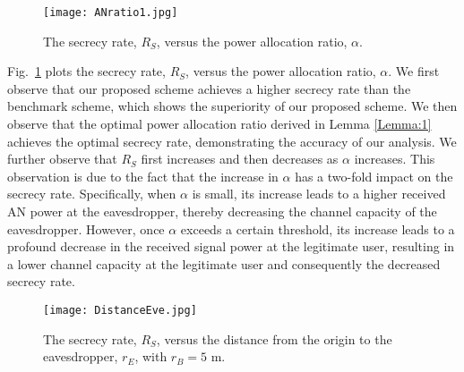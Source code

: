 \documentclass[10pt,technote]{IEEEtran}
\newcommand{\1}{\mathbbm{1}}
\begin{document}
\begin{figure}
    \centering
    \texttt{[image: ANratio1.jpg]}
    \vspace{-1em}
    \caption{The secrecy rate, $R_S$, versus the power allocation ratio, $\alpha$.}
    \vspace{-1.2em}
    \label{fig:num1}
\end{figure}

Fig.~\ref{fig:num1} plots the secrecy rate, $R_S$, versus the power allocation ratio, $\alpha$. We first observe that our proposed scheme achieves a higher secrecy rate than the benchmark scheme, which shows the superiority of our proposed scheme. We then observe that the optimal power allocation ratio derived in Lemma \ref{Lemma:1} achieves the optimal secrecy rate, demonstrating the accuracy of our analysis. We further observe that $R_S$ first increases and then decreases as $\alpha$ increases. This observation is due to the fact that the increase in $\alpha$ has a two-fold impact on the secrecy rate. Specifically, when $\alpha$ is small, its increase leads to a higher received AN power at the eavesdropper, thereby decreasing the channel capacity of the eavesdropper. However, once $\alpha$ exceeds a certain threshold, its increase leads to a profound decrease in the received signal power at the legitimate user, resulting in a lower channel capacity at the legitimate user and consequently the decreased secrecy rate.

\begin{figure}
    \centering
    \texttt{[image: DistanceEve.jpg]}
    \vspace{-1em}
    \caption{The secrecy rate, $R_S$, versus the distance from the origin to the eavesdropper, $r_E$, with $r_B = 5$ m.}
    \vspace{-1.2em}
    \label{fig:num2}
\end{figure}
\end{document}
